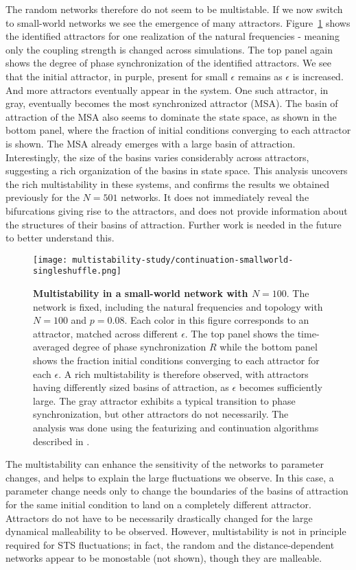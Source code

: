 The random networks therefore do not seem to be multistable. If we now switch to small-world networks we see the emergence of many attractors. Figure~\ref{fig:multistability-smallworld} shows the identified attractors for one realization of the natural frequencies - meaning only the coupling strength is changed across simulations. The top panel again shows the degree of phase synchronization of the identified attractors. We see that the initial attractor, in purple, present for small $\epsilon$ remains as $\epsilon$ is increased. And more attractors eventually appear in the system. One such attractor, in gray, eventually becomes the most synchronized attractor (MSA). The basin of attraction of the MSA also seems to dominate the state space, as shown in the bottom panel, where the fraction of initial conditions converging to each attractor is shown. The MSA already emerges with a large basin of attraction. Interestingly, the size of the basins varies considerably across attractors, suggesting a rich organization of the basins in state space. This analysis uncovers the rich multistability in these systems, and confirms the results we obtained previously for the $N=501$ networks. 
It does not immediately reveal the bifurcations giving rise to the attractors, and does not provide information about the structures of their basins of attraction. Further work is needed in the future to better understand this. 
%
\begin{figure}[htb!]
    \centering
    \texttt{[image: multistability-study/continuation-smallworld-singleshuffle.png]}
    \caption{\textbf{Multistability in a small-world network with $N=100$}.  The network is fixed, including the natural frequencies and topology with $N=100$ and $p=0.08$. Each color in this figure corresponds to an attractor, matched across different $\epsilon$. The top panel shows the time-averaged degree of phase synchronization $R$ while the bottom panel shows the fraction initial conditions converging to each attractor for each $\epsilon$. A rich multistability is therefore observed, with attractors having differently sized basins of attraction, as $\epsilon$ becomes sufficiently large. The gray attractor exhibits a typical transition to phase synchronization, but other attractors do not necessarily. The analysis was done using the featurizing and continuation algorithms described in .}
    \label{fig:multistability-smallworld}
\end{figure}


The multistability can enhance the sensitivity of the networks to parameter changes, and helps to explain the large fluctuations we observe. In this case, a parameter change needs only to change the boundaries of the basins of attraction for the same initial condition to land on a completely different attractor. Attractors do not have to be necessarily drastically changed for the large dynamical malleability to be observed.
However, multistability is not in principle required for STS fluctuations; in fact, the random and the distance-dependent networks appear to be monostable (not shown), though they are malleable. 

